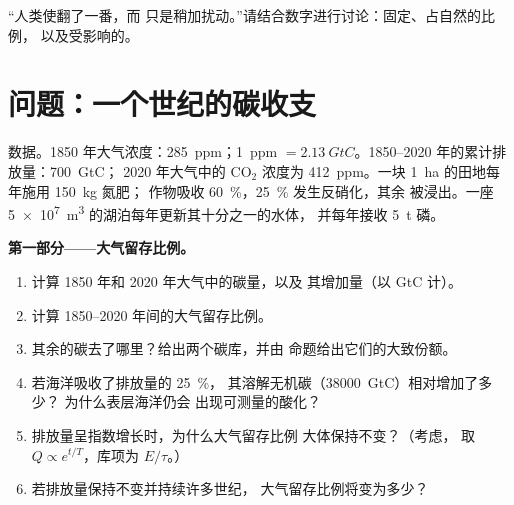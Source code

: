 \begin{exercise}[$\star\star\star$]\label{exo:b2:biogeochemical-cycles:12}
“人类使翻了一番，而
只是稍加扰动。”请结合数字进行讨论：固定、占自然的比例，
以及受影响的。
\end{exercise}

\section{问题：一个世纪的碳收支}

\begin{problem}
\label{pb:b2:biogeochemical-cycles:1}
数据。1850 年大气浓度：\qty{285}{ppm}；\qty{1}{ppm} $=
\qty{2.13}{GtC}$。1850--2020 年的累计排放量：\qty{700}{GtC}；
2020 年大气中的 $\mathrm{CO_2}$ 浓度为 \qty{412}{ppm}。一块
\qty{1}{ha} 的田地每年施用 \qty{150}{kg} 氮肥；
作物吸收 \qty{60}{\%}，\qty{25}{\%} 发生反硝化，其余
被浸出。一座 \qty{5e7}{m^3} 的湖泊每年更新其十分之一的水体，
并每年接收 \qty{5}{t} 磷。

\medskip
\noindent\textbf{第一部分——大气留存比例。}
\begin{enumerate}
  \item 计算 1850 年和 2020 年大气中的碳量，以及
        其增加量（以 GtC 计）。
  \item 计算 1850--2020 年间的大气留存比例。
  \item 其余的碳去了哪里？给出两个碳库，并由
        命题给出它们的大致份额。
  \item 若海洋吸收了排放量的 \qty{25}{\%}，
        其溶解无机碳（\qty{38000}{GtC}）相对增加了多少？
        为什么表层海洋仍会
        出现可测量的酸化？
  \item 排放量呈指数增长时，为什么大气留存比例
        大体保持不变？（考虑，
        取 $Q \propto e^{t/T}$，库项为 $E/\tau$。）
  \item 若排放量保持不变并持续许多世纪，
        大气留存比例将变为多少？
\end{enumerate}


\end{problem}
